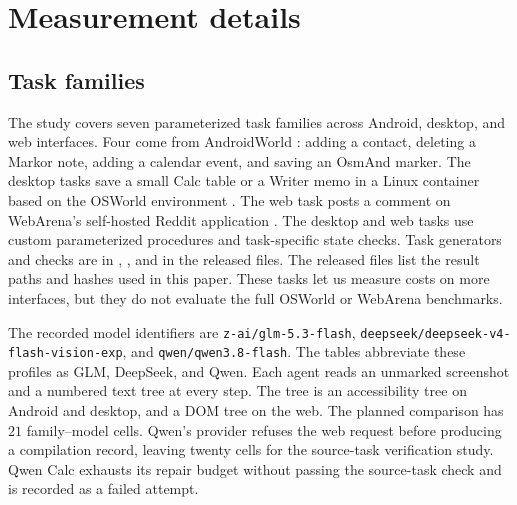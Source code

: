 \section{Measurement details}\label{app:measurement-details}

\subsection{Task families}
\label{sec:families}

The study covers seven parameterized task families across Android, desktop, and web interfaces.
Four come from AndroidWorld \citep{rawles2025androidworld}: adding a contact, deleting a Markor note, adding a calendar event, and saving an OsmAnd marker.
The desktop tasks save a small Calc table or a Writer memo in a Linux container based on the OSWorld environment \citep{xie2024osworld}.
The web task posts a comment on WebArena's self-hosted Reddit application \citep{zhou2024webarena}.
The desktop and web tasks use custom parameterized procedures and task-specific state checks.
Task generators and checks are in , , and  in the released files.
The released files list the result paths and hashes used in this paper.
These tasks let us measure costs on more interfaces, but they do not evaluate the full OSWorld or WebArena benchmarks.

The recorded model identifiers are \nolinkurl{z-ai/glm-5.3-flash}, \nolinkurl{deepseek/deepseek-v4-flash-vision-exp}, and \nolinkurl{qwen/qwen3.8-flash}.
The tables abbreviate these profiles as GLM, DeepSeek, and Qwen.
Each agent reads an unmarked screenshot and a numbered text tree at every step.
The tree is an accessibility tree on Android and desktop, and a DOM tree on the web.
The planned comparison has $21$ family--model cells.
Qwen's provider refuses the web request before producing a compilation record, leaving twenty cells for the source-task verification study.
Qwen Calc exhausts its repair budget without passing the source-task check and is recorded as a failed attempt.

